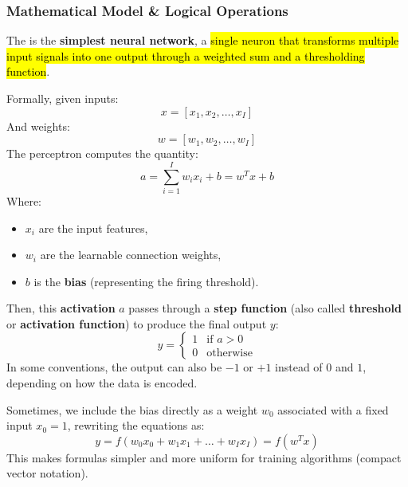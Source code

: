 \subsubsection{Mathematical Model \& Logical Operations}

The  is the \textbf{simplest neural network}, a \hl{single neuron that transforms multiple input signals into one output through a weighted sum and a thresholding function}.

\highspace
Formally, given inputs:
\begin{equation*}
    x = \left[x_{1}, x_{2}, \ldots, x_{I}\right]
\end{equation*}
And weights:
\begin{equation*}
    w = \left[w_{1}, w_{2}, \ldots, w_{I}\right]
\end{equation*}
The perceptron computes the quantity:
\begin{equation}
    a = \sum_{i=1}^{I} w_{i} x_{i} + b = w^{T} x + b
\end{equation}
Where:
\begin{itemize}
    \item $x_{i}$ are the input features,
    \item $w_{i}$ are the learnable connection weights,
    \item $b$ is the \textbf{bias} (representing the firing threshold).
\end{itemize}
Then, this \textbf{activation} $a$ passes through a \textbf{step function} (also called \textbf{threshold} or \textbf{activation function}) to produce the final output $y$:
\begin{equation}
    y =
    \begin{cases}
        1 & \text{if } a > 0 \\
        0 & \text{otherwise}
    \end{cases}
\end{equation}
In some conventions, the output can also be $-1$ or $+1$ instead of $0$ and $1$, depending on how the data is encoded.

\highspace
Sometimes, we include the bias directly as a weight $w_{0}$ associated with a fixed input $x_{0} = 1$, rewriting the equations as:
\begin{equation}
    y = f\left(w_0 x_0 + w_1 x_1 + \ldots + w_I x_I\right) = f\left(w^T x\right)
\end{equation}
This makes formulas simpler and more uniform for training algorithms (compact vector notation).

